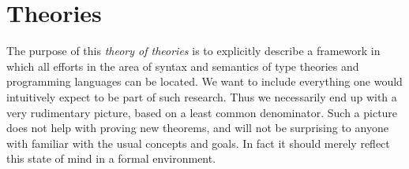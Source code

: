 \documentclass[11pt]{article}
\date{\today}
\title{}
\begin{document}
\tableofcontents

\section{Theories}
\label{sec:orga630965}

The purpose of this \emph{theory of theories} is to explicitly describe a framework in
which all efforts in the area of syntax and semantics of type theories and programming languages
can be located. We want to include everything one would intuitively expect to be part of such research.
Thus we necessarily end up with a very rudimentary picture, based on a least common denominator.
Such a picture does not help with proving new theorems, and will not be surprising to anyone with familiar
with the usual concepts and goals. In fact it should merely reflect this state of mind in a formal environment.




\end{document}
